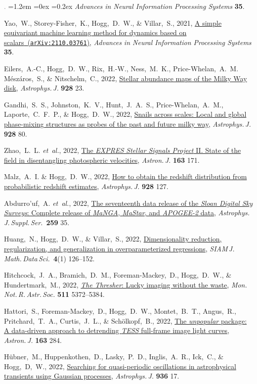 \documentclass[10pt,letterpaper]{article}
\newcommand{\acronym}[1]{{\small{#1}}}
\newcommand{\foreign}[1]{\textsl{#1}}
\newcommand{\etal}{\foreign{et~al.}}
\newcommand{\project}[1]{\textsl{#1}}
\newcommand{\doi}[2]{\href{http://dx.doi.org/#1}{{#2}}}
\newcommand{\arxiv}[2]{\href{http://arxiv.org/abs/#1}{{#2}\ (\texttt{arXiv:#1})}}
\newcommand{\deemph}[1]{\textcolor{grey}{\footnotesize{#1}}}
\newcommand{\pubnumber}[1]{\deemph{{#1}.}}
\newcounter{refpubnum}
\newcommand{\hogglist}{%
    \rightmargin=0in
    \leftmargin=1.2em
    \topsep=0ex
    \partopsep=0pt
    \itemsep=0.2ex
    \parsep=0pt
    \itemindent=-1.0\leftmargin
    \listparindent=0.0\leftmargin
    \settowidth{\labelsep}{~}
    \usecounter{refpubnum}
  }
\begin{document}
\begin{list}{\pubnumber{\therefpubnum}}{\hogglist}
  \textit{Advances in Neural Information Processing Systems} \textbf{35}.
\item
  Yao,~W., Storey-Fisher,~K., Hogg,~D.~W., \& Villar,~S., 2021,
  \arxiv{2110.03761}{A simple equivariant machine learning method for dynamics based on scalars},
  \textit{Advances in Neural Information Processing Systems} \textbf{35}.
\item
  Eilers,~A.-C., Hogg,~D.~W., Rix,~H.-W., Ness,~M.~K., Price-Whelan,~A.~M. M\'esz\'aros,~S.,
  \& Nitschelm,~C., 2022,
  \doi{10.3847/1538-4357/ac54ad}{Stellar abundance maps of the Milky Way disk},
  \textit{Astrophys.\,J.} \textbf{928} 23.  
\item
  Gandhi,~S.~S., Johnston,~K.~V., Hunt,~J.~A.~S., Price-Whelan,~A.~M., Laporte,~C.~F.~P.,
  \& Hogg,~D.~W., 2022,
  \doi{10.3847/1538-4357/ac47f7}{Snails across scales: Local and global phase-mixing structures as probes of the past and future milky way},
  \textit{Astrophys.\,J.} \textbf{928} 80.
\item
  Zhao,~L.~L. \etal, 2022,
  \doi{10.3847/1538-3881/ac5176}{The \project{EXPRES Stellar Signals Project} II. State of the field in disentangling photospheric velocities},
  \textit{Astron.\,J.} \textbf{163} 171.  
\item
  Malz,~A.~I. \& Hogg,~D.~W., 2022,
  \doi{10.3847/1538-4357/ac062f}{How to obtain the redshift distribution from probabilistic redshift estimates},
  \textit{Astrophys.\,J.} \textbf{928} 127.
\item
  Abdurro'uf,~A. \etal, 2022,
  \doi{10.3847/1538-4365/ac4414}{The seventeenth data release of the \project{Sloan Digital Sky Surveys}: Complete release of \project{MaNGA}, \project{MaStar}, and \project{APOGEE-2} data},
  \textit{Astrophys.\,J.\,Suppl.\,Ser.}\ \textbf{259} 35.
\item
  Huang,~N., Hogg,~D.~W., \& Villar,~S., 2022,
  \doi{10.1137/20M1387821}{Dimensionality reduction, regularization, and generalization in overparameterized regressions},
  \textit{\acronym{SIAM}\,J.\,Math.\,Data\,Sci.}\ \textbf{4}(1) 126--152.
\item
  Hitchcock,~J.~A., Bramich,~D.~M., Foreman-Mackey,~D., Hogg,~D.~W., \& Hundertmark,~M., 2022,
  \doi{10.1093/mnras/stac427}{\project{The Thresher}: Lucky imaging without the waste},
  \textit{Mon.\,Not.\,R.\,Astr.\,Soc.} \textbf{511} 5372--5384. 
\item
  Hattori,~S., Foreman-Mackey,~D., Hogg,~D.~W., Montet,~B.~T., Angus,~R., Pritchard,~T.~A.,
  Curtis,~J.~L., \& Sch\"olkopf,~B., 2022,
  \doi{10.3847/1538-3881/ac625a}{The \project{unpopular} package: A data-driven approach to detrending \project{TESS} full-frame image light curves},
  \textit{Astron.\,J.} \textbf{163} 284.  
\item
  H\"ubner,~M., Huppenkothen,~D., Lasky,~P.~D., Inglis,~A.~R., Ick,~C., \& Hogg,~D,~W., 2022,
  \doi{10.3847/1538-4357/ac7959}{Searching for quasi-periodic oscillations in astrophysical transients using Gaussian processes},
  \textit{Astrophys.\,J.} \textbf{936} 17.
\label{rpcount}\end{list}
\end{document}
